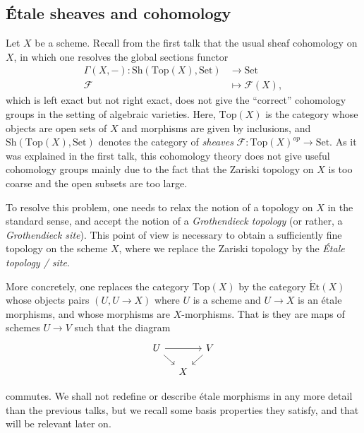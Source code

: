 \documentclass{article}
\newcommand{\Top}{\mathrm{Top}}
\newcommand{\Set}{\mathrm{Set}}
\newcommand{\Et}{\acute{\mathrm{E}}\mathrm{t}}
\theoremstyle{plain}
\theoremstyle{definition}
\begin{document}
    \subsection{\'{E}tale sheaves and cohomology}\label{sec:recap}
    Let $X$ be a scheme. Recall from the first talk that the usual sheaf cohomology on $X$, in which one resolves the global sections functor
    \begin{align*}
        \Gamma(X,-):\mathrm{Sh}(\Top(X),\Set)&\longrightarrow\Set\\
        \mathcal{F} &\longmapsto\mathcal{F} (X),    
    \end{align*} 
    which is left exact but not right exact, does not give the ``correct'' cohomology groups in the setting of algebraic varieties.  Here, $\Top(X)$ is the category whose objects are open sets of $X$ and morphisms are given by inclusions, and $\mathrm{Sh}(\Top(X),\Set)$ denotes the category of \textit{sheaves} $\mathcal{F} :\Top(X)^{op}\to\Set$. As it was explained in the first talk, this cohomology theory does not give useful cohomology groups mainly due to the fact that the Zariski topology on $X$ is too coarse and the open subsets are too large.

    To resolve this problem, one needs to relax the notion of a topology on $X$ in the standard sense, and accept the notion of a \textit{Grothendieck topology} (or rather, a \textit{Grothendieck site}). This point of view is necessary to obtain a sufficiently fine topology on the scheme $X$, where we replace the Zariski topology by the \textit{\'{E}tale topology / site}. 

    More concretely, one replaces the category $\Top(X)$ by the category $\Et(X)$ whose objects pairs $(U,U\to X)$ where $U$ is a scheme and $U\to X$ is an \'{e}tale morphisms, and whose morphisms are $X$-morphisms. That is they are maps of schemes $U\to V$ such that the diagram 
    \[
        \begin{tikzcd}[row sep=1em, column sep=1em]
            U \arrow[rr, ""] \arrow[dr, ""]  & & V \arrow[dl, ""] \\
            & X &
        \end{tikzcd}
    \]

    commutes. We shall not redefine or describe \'{e}tale morphisms in any more detail than the previous talks, but we recall some basis properties they satisfy, and that will be relevant later on.
\end{document}
